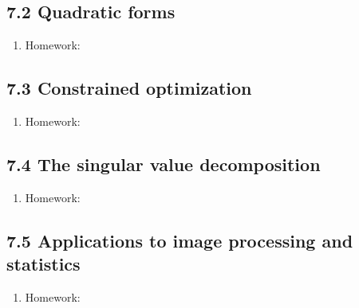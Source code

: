 \documentclass{article}
\begin{document}
\subsection{7.2 Quadratic forms}

\begin{enumerate}

\item Homework: 

\end{enumerate}

\subsection{7.3 Constrained optimization}

\begin{enumerate}

\item Homework: 

\end{enumerate}

\subsection{7.4 The singular value decomposition}

\begin{enumerate}

\item Homework: 

\end{enumerate}

\subsection{7.5 Applications to image processing and statistics}

\begin{enumerate}

\item Homework: 

\end{enumerate}
\end{document}
